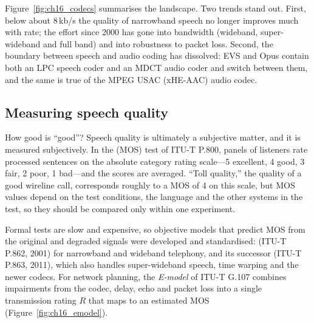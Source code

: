 Figure~\ref{fig:ch16_codecs} summarises the landscape. Two trends stand out. First, below about
8\,kb/s the quality of narrowband speech no longer improves much with rate; the effort since 2000 has
gone into bandwidth (wideband, super-wideband and full band) and into robustness to packet loss.
Second, the boundary between speech and audio coding has dissolved: EVS and Opus contain both an LPC
speech coder and an MDCT audio coder and switch between them, and the same is true of the MPEG USAC
(xHE-AAC) audio codec.


\subsection{Measuring speech quality}

How good is ``good''? Speech quality is ultimately a subjective matter, and it is measured
subjectively. In the  (MOS) test of ITU-T P.800, panels of listeners rate
processed sentences on the absolute category rating scale---5 excellent, 4 good, 3 fair, 2 poor, 1
bad---and the scores are averaged. ``Toll quality,'' the quality of a good wireline call, corresponds
roughly to a MOS of 4 on this scale, but MOS values depend on the test conditions, the language and
the other systems in the test, so they should be compared only within one experiment.

Formal tests are slow and expensive, so objective models that predict MOS from the original and
degraded signals were developed and standardised:  (ITU-T P.862, 2001) for narrowband and
wideband telephony, and its successor  (ITU-T P.863, 2011), which also handles
super-wideband speech, time warping and the newer codecs. For network planning, the \emph{E-model} of
ITU-T G.107 combines impairments from the codec, delay, echo and packet loss into a single
transmission rating $R$ that maps to an estimated MOS (Figure~\ref{fig:ch16_emodel}).

